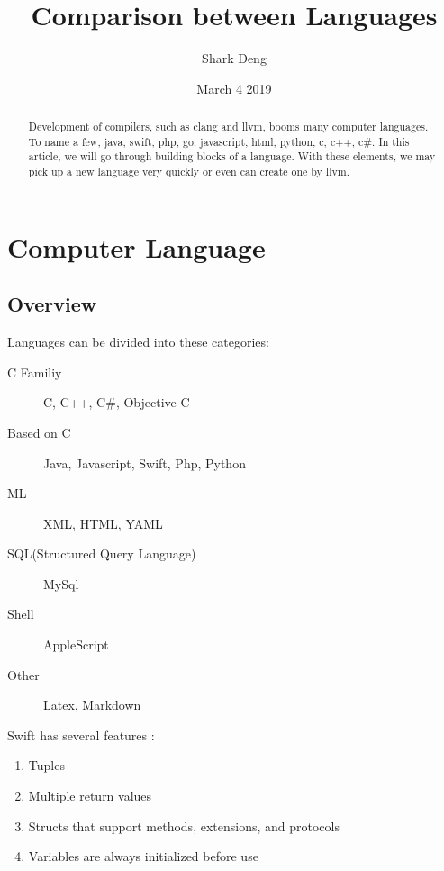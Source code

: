 \documentclass[12pt, a4paper]{report}
\begin{document}
\title{\textbf{Comparison between Languages}}
\author{Shark Deng}
\date{March 4 2019}
\maketitle

\begin{abstract}
Development of compilers, such as clang and llvm, booms many computer languages. To name a few, java, swift, php, go, javascript, html, python, c, c++, c\#. In this article, we will go through building blocks of a language. With these elements, we may pick up a new language very quickly or even can create one by llvm.
\end{abstract}

\tableofcontents

\chapter{Computer Language}
\section{Overview}
	Languages can be divided into these categories:
	\begin{description}
		\item[C Familiy] C, C++, C\#, Objective-C
		\item[Based on C] Java, Javascript, Swift, Php, Python
		\item[ML] XML, HTML, YAML
		\item[SQL(Structured Query Language)]  MySql
		\item[Shell] AppleScript
		\item[Other] Latex, Markdown
	\end{description}
	Swift has several features \citep{swift}:
	\begin{enumerate}
	    \item Tuples
	    \item Multiple return values
	    \item Structs that support methods, extensions, and protocols
	    \item Variables are always initialized before use
	\end{enumerate}
	

	
\end{document}
